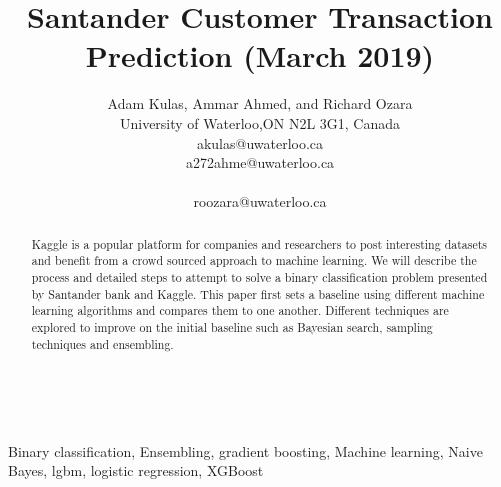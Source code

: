 \documentclass[journal,twoside,web]{ieeecolor}
\begin{document}
\title{Santander Customer Transaction Prediction (March 2019)} \\

\author{Adam Kulas, Ammar Ahmed, and Richard Ozara\\
\institute University of Waterloo,ON N2L 3G1, Canada\\akulas@uwaterloo.ca\\
a272ahme@uwaterloo.ca \\\centerline{roozara@uwaterloo.ca}}

\maketitle



\begin{abstract}
Kaggle is a popular platform for companies and researchers to post interesting datasets and benefit from a crowd sourced approach to machine learning. We will describe the process and detailed steps to attempt to solve a binary classification problem presented by Santander bank and Kaggle. This paper first sets a baseline using different machine learning algorithms and compares them to one another. Different techniques are explored to improve on the initial baseline such as Bayesian search, sampling techniques and ensembling. 
\end{abstract}

\begin{IEEEkeywords}
Binary classification, Ensembling, gradient boosting, Machine learning, Naive Bayes, lgbm, logistic regression, XGBoost
\end{IEEEkeywords}


\end{document}
